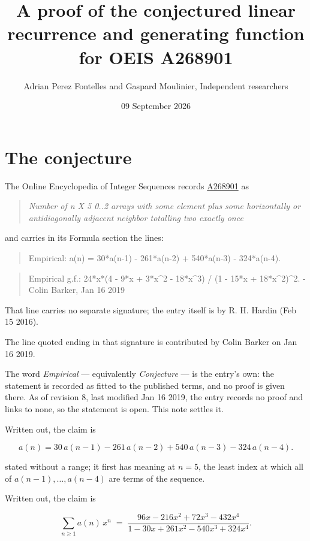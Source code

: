 \documentclass[11pt]{article}
\title{A proof of the conjectured linear recurrence and generating function for OEIS A268901}
\author{Adrian Perez Fontelles and Gaspard Moulinier, Independent researchers}
\date{09 September 2026}
\theoremstyle{definition}
\begin{document}
\maketitle
\section{The conjecture}

The Online Encyclopedia of Integer Sequences records \href{https://oeis.org/A268901}{A268901} as

\begin{quote}\itshape Number of n X 5 0..2 arrays with some element plus some horizontally or antidiagonally adjacent neighbor totalling two exactly once\end{quote}

and carries in its Formula section the lines:

\begin{quote}\ttfamily Empirical: a(n) = 30*a(n-1) - 261*a(n-2) + 540*a(n-3) - 324*a(n-4).\end{quote}

\begin{quote}\ttfamily Empirical g.f.: 24*x*(4 - 9*x + 3*x\textasciicircum{}2 - 18*x\textasciicircum{}3) / (1 - 15*x + 18*x\textasciicircum{}2)\textasciicircum{}2. - Colin Barker, Jan 16 2019\end{quote}

That line carries no separate signature; the entry itself is by R. H. Hardin (Feb 15 2016).

The line quoted ending in that signature is contributed by Colin Barker on Jan 16 2019.

The word {\itshape Empirical} --- equivalently {\itshape Conjecture} --- is the entry's own: the statement is recorded as fitted to the published terms, and no proof is given there. As of revision 8, last modified Jan 16 2019, the entry records no proof and links to none, so the statement is open. This note settles it.

Written out, the claim is

\[a(n) = 30\,a(n-1) - 261\,a(n-2) + 540\,a(n-3) - 324\,a(n-4).\]

stated without a range; it first has meaning at $n = 5$, the least index at which all of $a(n-1),\dots,a(n-4)$ are terms of the sequence.

Written out, the claim is

\[\sum_{n \ge 1} a(n)\,x^n \;=\; \frac{96x - 216x^{2} + 72x^{3} - 432x^{4}}{1 - 30x + 261x^{2} - 540x^{3} + 324x^{4}}.\]
\end{document}
